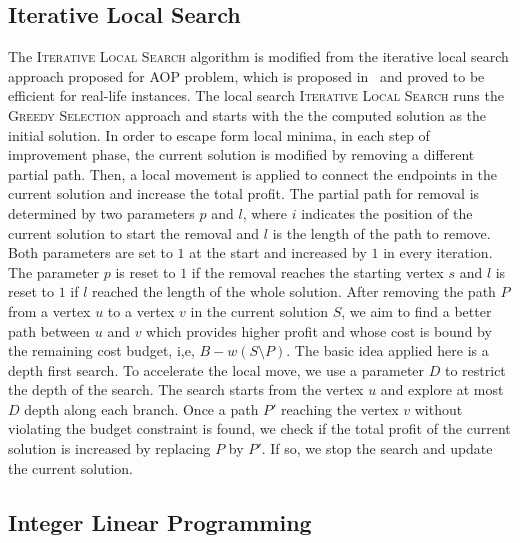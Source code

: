 \documentclass[sigconf,natbib=false]{acmart}
\newcommand{\greedy}{\textsc{Greedy Selection}\xspace}
\newcommand{\ils}{\textsc{Iterative Local Search}\xspace}
\newcommand{\AOP}{\textsc{AOP}\xspace}
\begin{document}
\subsection{Iterative Local Search}
\label{alg:ILS}
The \ils algorithm is modified from the iterative local search approach proposed for \AOP problem, which is proposed in~\cite{} and proved to be efficient for real-life instances. 
The local search \ils runs the \greedy approach and starts with the the computed solution as the initial solution.
In order to escape form local minima, in each step of improvement phase, the current solution is modified by removing a different partial path. Then, a local movement is applied to connect the endpoints in the current solution and increase the total profit.
The partial path for removal is determined by two parameters $p$ and $l$, where $i$ indicates the position of the current solution to start the removal and $l$ is the length of the path to remove. 
Both parameters are set to $1$ at the start and increased by $1$ in every iteration. The parameter $p$ is reset to $1$ if the removal reaches the starting vertex $s$ and $l$ is reset to $1$ if $l$ reached the length of the whole solution.     
After removing the path $P$ from a vertex $u$ to a vertex $v$ in the current solution $S$, we aim to find a better path between $u$ and $v$ which provides higher profit and whose cost is bound by the remaining cost budget, i,e, $B- w(S\setminus P)$.    
The basic idea applied here is a depth first search. To accelerate the local move, we use a parameter $D$ to restrict the depth of the search. The search starts from  the vertex $u$ and explore at most $D$ depth along each branch. Once a path $P'$ reaching the vertex $v$  without violating the budget constraint is found, we check if the total profit of the current solution is increased by replacing $P$ by $P'$. 
If so, we stop the search and update the current solution. 

\subsection{Integer Linear Programming}
\label{alg:ILP}
\end{document}
